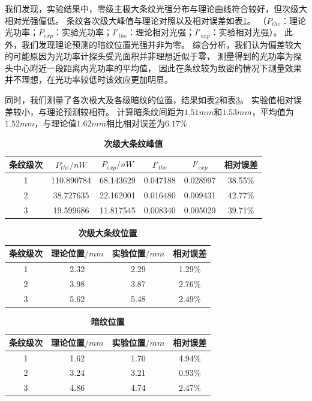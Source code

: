 \documentclass[12pt,a4paper,UTF8]{ctexart}
\begin{document}
我们发现，实验结果中，零级主极大条纹光强分布与理论曲线符合较好，但次级大相对光强偏低。
条纹各次级大峰值与理论对照以及相对误差如表\ref{tab:1.1}。
（$P_{the}$：理论光功率；$P_{exp}$：实验光功率；$I'_{the}$：理论相对光强；$I'_{exp}$：实验相对光强）。
此外，我们发现理论预测的暗纹位置光强并非为零。
综合分析，我们认为偏差较大的可能原因为光功率计探头受光面积并非理想近似于零，
测量得到的光功率为探头中心附近一段距离内光功率的平均值，
因此在条纹较为致密的情况下测量效果并不理想，在光功率较低时该效应更加明显。

同时，我们测量了各次极大及各级暗纹的位置，结果如表\ref{tab:1.2}和表\ref{tab:1.3}。
实验值相对误差较小，与理论预测较相符。
计算暗条纹间距为$1.51mm$和$1.53mm$，平均值为$1.52mm$，与理论值$1.62mm$相比相对误差为$6.17\%$

\begin{table}[htbp]
	\centering
	\begin{tabular}{cccccc}
	\toprule
	条纹级次 &$P_{the}/nW$ &$P_{exp}/nW$ &$I'_{the}$ &$I'_{exp}$ &相对误差 \\
	\midrule
	1 &110.890784 &68.143629 &0.047188 &0.028997 &38.55\% \\
	2  &38.727635 &22.162001 &0.016480 &0.009431 &42.77\% \\
	3  &19.599686 &11.817545  &0.008340 &0.005029 &39.71\% \\
	\bottomrule
    \end{tabular}
	\caption{\textbf{次级大条纹峰值}}
	\label{tab:1.1}
\end{table}

\begin{table}[htbp]
	\centering
		\begin{tabular}{cccc}
			\toprule
			条纹级次	&理论位置$/mm$	&实验位置$/mm$	&相对误差 \\
			\midrule
			1  &2.32  &2.29  &1.29\% \\
			2  &3.98  &3.87  &2.76\% \\
			3  &5.62  &5.48  &2.49\% \\	
			\bottomrule
		\end{tabular}
		\caption{\textbf{次级大条纹位置}}
		\label{tab:1.2}
\end{table}

\begin{table}[htbp]
    \centering
		\begin{tabular}{cccc}
			\toprule
			条纹级次	&理论位置$/mm$	&实验位置$/mm$	&相对误差 \\
			\midrule
			1  &1.62  &1.70   &4.94\% \\
			2  &3.24  &3.21   &0.93\% \\
			3  &4.86  &4.74   &2.47\% \\	
			\bottomrule
		\end{tabular}
		\caption{\textbf{暗纹位置}}
		\label{tab:1.3}
\end{table}
\end{document}
